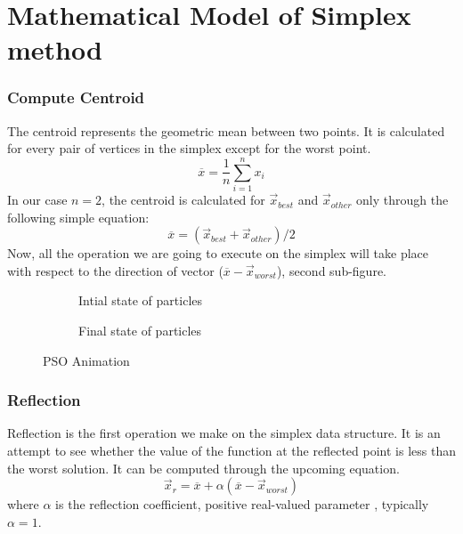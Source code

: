 \section{Mathematical Model of Simplex method}
\subsubsection{Compute Centroid}

The centroid represents the geometric mean between two points. It is
calculated for every pair of vertices in the simplex except for the
worst point.\\
{\[\overline{x} = \frac{1}{n}\sum\limits_{i = 1}^{n}x_{i}\]}In our case
{\(n = 2\)}, the centroid is calculated for
{\({\overset{\rightarrow}{x}}_{best}\)} and
{\({\overset{\rightarrow}{x}}_{other}\)} only through the following
simple equation:\\
{\[\overline{x} = ({\overset{\rightarrow}{x}}_{best} + {\overset{\rightarrow}{x}}_{other})/2\]}Now,
all the operation we are going to execute on the simplex will take place
with respect to the direction of vector
({\(\overline{x} - {\overset{\rightarrow}{x}}_{worst}\)}), second
sub-figure.

\begin{figure}[htp]
\begin{subfigure}{0.5\textwidth}
    \centering
   \scalebox{1.1}{}
  \caption{Intial state of particles}
  \label{fig:sub1}
\end{subfigure}%
\begin{subfigure}{0.5\textwidth}
 \centering
   \scalebox{1.1}{}
  \caption{Final state of particles}
  \label{fig:sub2}
\end{subfigure}
\caption{PSO Animation}
\label{fig:test}
\end{figure}
\subsubsection{Reflection}

Reflection is the first operation we make on the simplex data structure.
It is an attempt to see whether the value of the function at the
reflected point is less than the worst solution. It can be computed
through the upcoming equation.\\
{\[{\overset{\rightarrow}{x}}_{r} = \overline{x} + \alpha(\overline{x} - {\overset{\rightarrow}{x}}_{worst})\]}where
{\(\alpha\)} is the reflection coefficient, positive real-valued
parameter , typically {\(\alpha = 1\)}.

